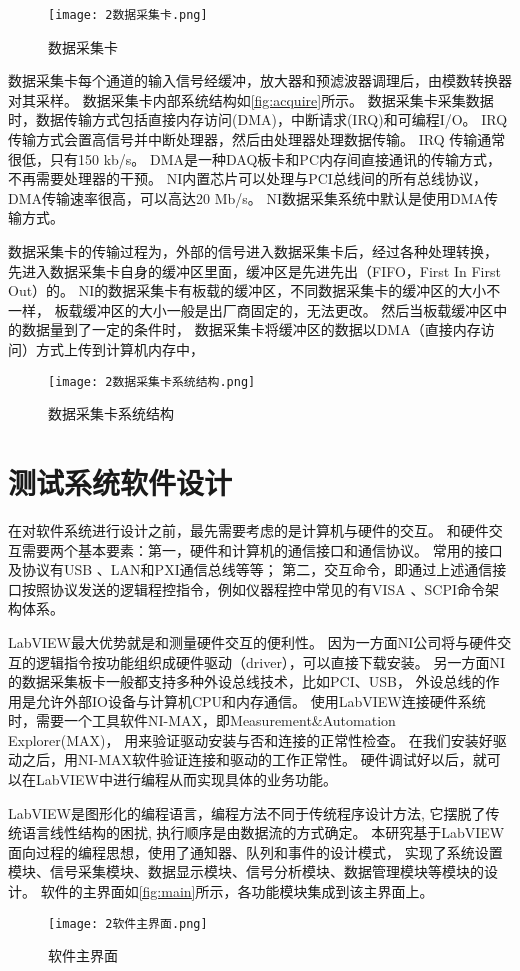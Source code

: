 \begin{figure}[htbp]
    \centering
    \texttt{[image: 2数据采集卡.png]}
    \caption{\label{fig:acquire}数据采集卡}
\end{figure}
​
数据采集卡每个通道的输入信号经缓冲，放大器和预滤波器调理后，由模数转换器对其采样。
数据采集卡内部系统结构如\autoref{fig:acquire}所示。
数据采集卡采集数据时，数据传输方式包括直接内存访问(DMA)，中断请求(IRQ)和可编程I/O。
IRQ传输方式会置高信号并中断处理器，然后由处理器处理数据传输。
IRQ 传输通常很低，只有150 kb/s。
DMA是一种DAQ板卡和PC内存间直接通讯的传输方式，不再需要处理器的干预。
NI内置芯片可以处理与PCI总线间的所有总线协议，DMA传输速率很高，可以高达20 Mb/s。
NI数据采集系统中默认是使用DMA传输方式。

数据采集卡的传输过程为，外部的信号进入数据采集卡后，经过各种处理转换，
先进入数据采集卡自身的缓冲区里面，缓冲区是先进先出（FIFO，First In First Out）的。
NI的数据采集卡有板载的缓冲区，不同数据采集卡的缓冲区的大小不一样，
板载缓冲区的大小一般是出厂商固定的，无法更改。
然后当板载缓冲区中的数据量到了一定的条件时，
数据采集卡将缓冲区的数据以DMA（直接内存访问）方式上传到计算机内存中，
\begin{figure}[htbp]
    \centering
    \texttt{[image: 2数据采集卡系统结构.png]}
    \caption{\label{fig:acquire}数据采集卡系统结构}
\end{figure}

\section{测试系统软件设计}
在对软件系统进行设计之前，最先需要考虑的是计算机与硬件的交互。
和硬件交互需要两个基本要素：第一，硬件和计算机的通信接口和通信协议。
常用的接口及协议有USB 、LAN和PXI通信总线等等；
第二，交互命令，即通过上述通信接口按照协议发送的逻辑程控指令，例如仪器程控中常见的有VISA 、SCPI命令架构体系。

LabVIEW最大优势就是和测量硬件交互的便利性。
因为一方面NI公司将与硬件交互的逻辑指令按功能组织成硬件驱动（driver），可以直接下载安装。
另一方面NI的数据采集板卡一般都支持多种外设总线技术，比如PCI、USB，
外设总线的作用是允许外部IO设备与计算机CPU和内存通信。
使用LabVIEW连接硬件系统时，需要一个工具软件NI-MAX，即Measurement\&Automation Explorer(MAX)，
用来验证驱动安装与否和连接的正常性检查。
在我们安装好驱动之后，用NI-MAX软件验证连接和驱动的工作正常性。
硬件调试好以后，就可以在LabVIEW中进行编程从而实现具体的业务功能。

LabVIEW是图形化的编程语言，编程方法不同于传统程序设计方法, 它摆脱了传统语言线性结构的困扰, 
执行顺序是由数据流的方式确定。
本研究基于LabVIEW面向过程的编程思想，使用了通知器、队列和事件的设计模式，
实现了系统设置模块、信号采集模块、数据显示模块、信号分析模块、数据管理模块等模块的设计。
软件的主界面如\autoref{fig:main}所示，各功能模块集成到该主界面上。
\begin{figure}[htbp]
    \centering
    \texttt{[image: 2软件主界面.png]}
    \caption{\label{fig:main}软件主界面}
\end{figure}

